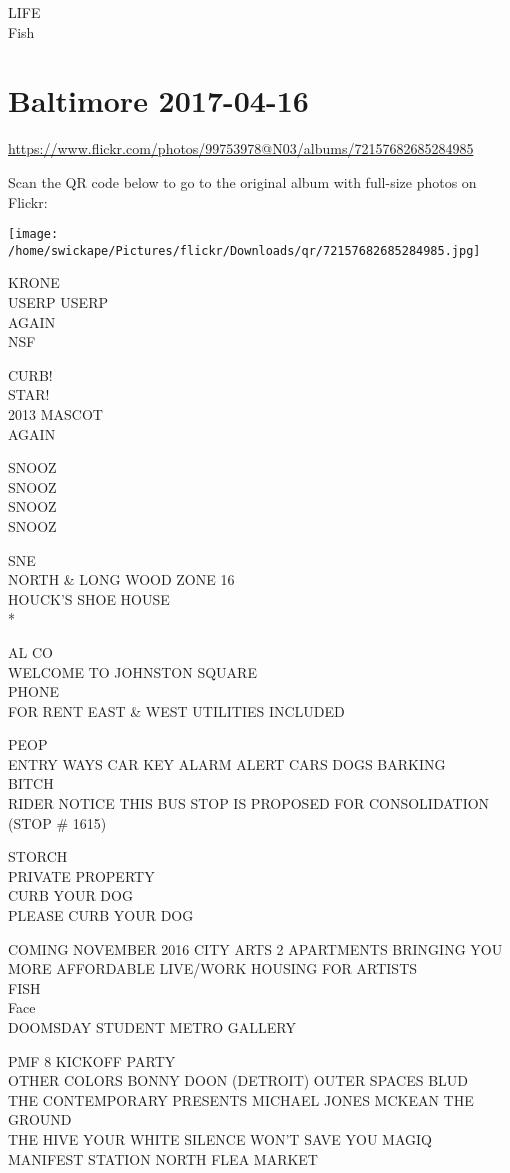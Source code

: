 \documentclass[10pt,letterpaper]{article}
\begin{document}
LIFE\\
Fish


\section*{Baltimore 2017-04-16}

\url{https://www.flickr.com/photos/99753978@N03/albums/72157682685284985}

Scan the QR code below to go to the original album with full-size photos on Flickr:

\texttt{[image: /home/swickape/Pictures/flickr/Downloads/qr/72157682685284985.jpg]}


KRONE\\
USERP USERP\\
AGAIN\\
NSF

CURB!\\
STAR!\\
2013 MASCOT\\
AGAIN

SNOOZ\\
SNOOZ\\
SNOOZ\\
SNOOZ

SNE\\
NORTH \& LONG WOOD ZONE 16\\
HOUCK'S SHOE HOUSE\\
*

AL CO\\
WELCOME TO JOHNSTON SQUARE\\
PHONE\\
FOR RENT EAST \& WEST UTILITIES INCLUDED

PEOP\\
ENTRY WAYS CAR KEY ALARM ALERT CARS DOGS BARKING\\
BITCH\\
RIDER NOTICE THIS BUS STOP IS PROPOSED FOR CONSOLIDATION (STOP \# 1615)

STORCH\\
PRIVATE PROPERTY\\
CURB YOUR DOG\\
PLEASE CURB YOUR DOG

COMING NOVEMBER 2016 CITY ARTS 2 APARTMENTS BRINGING YOU MORE AFFORDABLE LIVE/WORK HOUSING FOR ARTISTS\\
FISH\\
Face\\
DOOMSDAY STUDENT METRO GALLERY

PMF 8 KICKOFF PARTY\\
OTHER COLORS BONNY DOON (DETROIT) OUTER SPACES BLUD\\
THE CONTEMPORARY PRESENTS MICHAEL JONES MCKEAN THE GROUND\\
THE HIVE YOUR WHITE SILENCE WON'T SAVE YOU MAGIQ MANIFEST STATION NORTH FLEA MARKET
\end{document}
